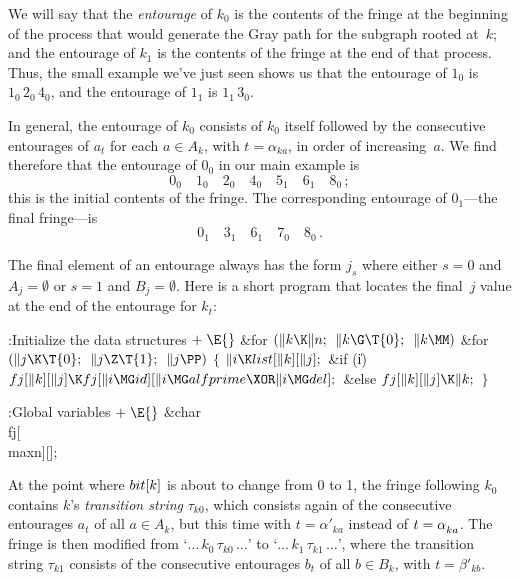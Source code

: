 We will say that the {\it entourage\/} of $k_0$ is the contents of the
fringe at the beginning of the process that would generate the Gray path
for the subgraph rooted at~$k$; and the entourage of $k_1$ is the
contents of the fringe at the end of that process. Thus, the small
example we've just seen shows us that the entourage of $1_0$ is
$1_0\,2_0\,4_0$, and the entourage of $1_1$ is $1_1\,3_0$.

In general, the entourage of $k_0$ consists of $k_0$ itself followed by
the consecutive entourages of $a_t$ for each $a\in A_k$, with $t=\alpha_{ka}$,
in order of increasing~$a$. We find therefore that the entourage of $0_0$
in our main example is
$$0_0\quad 1_0\quad 2_0\quad 4_0\quad 5_1\quad 6_1\quad 8_0\,;$$
this is the initial contents of the fringe. The corresponding entourage of
$0_1$---the final fringe---is
$$0_1\quad 3_1\quad 6_1\quad 7_0\quad 8_0\,.$$

The final element of an entourage always has the form $j_s$ where
either $s=0$ and $A_j=\emptyset$ or $s=1$ and $B_j=\emptyset$.
Here is a short program that locates the final~$j$ value at the
end of the entourage for $k_t$:

\Y\B\4:Initialize the data structures\X${}\mathrel+\E{}$\6
\&{for} ${}(\|k\K\|n;{}$ ${}\|k\G\T{0};{}$ ${}\|k\MM){}$\1\6
\&{for} ${}(\|j\K\T{0};{}$ ${}\|j\Z\T{1};{}$ ${}\|j\PP){}$\5
${}\{{}$\1\6
${}\|i\K\\{list}[\|k][\|j];{}$\6
\&{if} (\|i)\1\5
${}\\{fj}[\|k][\|j]\K\\{fj}[\|i\MG\\{id}][\|i\MG\\{alfprime}\XOR\|i\MG%
\\{del}];{}$\2\6
\&{else}\1\5
${}\\{fj}[\|k][\|j]\K\|k;{}$\2\6
\4${}\}{}$\2\2\par
\fi

\B{}:Global variables\X${}\mathrel+\E{}$\6
\&{char} \\{fj}[\\{maxn}][];\par
\fi

At the point where $\\{bit}[k]$ is about to change from 0 to
1, the fringe
following $k_0$ contains $k$'s {\it transition string\/} $\tau_{k0}$, which
consists again of the consecutive entourages $a_t$ of all $a\in A_k$, but
this time with $t=\alpha'_{ka}$ instead of $t=\alpha\losub{ka}$.
The fringe is then modified from `$\ldots\,k_0\,\tau_{k0}\,\ldots$' to
`$\ldots\,k_1\,\tau_{k1}\,\ldots$',
where the transition string $\tau_{k1}$ consists of the consecutive
entourages $b_t$ of all $b\in B_k$, with $t=\beta'_{kb}$.

